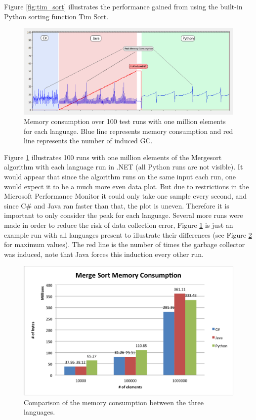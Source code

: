 Figure \ref{fig:tim_sort} illustrates the performance gained from using the built-in Python sorting function Tim Sort. 



\begin{figure}[h]
	\centering
	\includegraphics[width=1.0\textwidth]{chapters/media/mergesort_memory_1mil_all.png}
	\caption{Memory consumption over 100 test runs with one million elements for each language. Blue line represents memory consumption and red line represents the number of induced GC.}
	\label{fig:merge_sort_memory_all}
\end{figure}


Figure \ref{fig:merge_sort_memory_all} illustrates 100 runs with one million elements of the Mergesort algorithm with each language run in .NET (all Python runs are not visible). It would appear that since the algorithm runs on the same input each run, one would expect it to be a much more even data plot. But due to restrictions in the Microsoft Performance Monitor it could only take one sample every second, and since C\# and Java ran faster than that, the plot is uneven. Therefore it is important to only consider the peak for each language. Several more runs were made in order to reduce the risk of data collection error, Figure \ref{fig:merge_sort_memory_all} is just an example run with all languages present to illustrate their differences (see Figure \ref{fig:merge_sort_memory} for  maximum values). The red line is the number of times the garbage collector was induced, note that Java forces this induction every other run.


\begin{figure}[h]
	\centering
	\includegraphics[width=1.0\textwidth]{chapters/media/merge_sort_memory.png}
	\caption{Comparison of the memory consumption between the three languages.}
	\label{fig:merge_sort_memory}
\end{figure}

